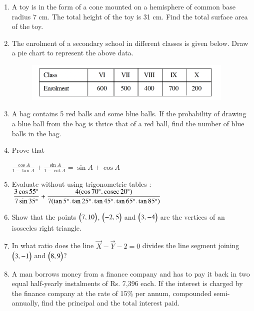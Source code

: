 \documentclass[journal,12pt,twocolumn]{IEEEtran}
\begin{document}
\begin{enumerate}
 \medskip
 \item A toy is in the form of a cone mounted on a hemisphere of common base radius 7 cm. The total height of the toy is 31 cm. Find the total surface area of the toy.
 \medskip
 \item The enrolment of a secondary school in different classes is given below. Draw a pie chart to represent the above data.
 \begin{figure}[h!]
    \centering
    \includegraphics[width=10cm]{7.png}
 \end{figure}
 \medskip
 \item A bag contains 5 red balls and some blue balls. If the probability of drawing a blue ball from the bag is thrice that of a red ball, find the number of blue balls in the bag.
 \medskip
 \item Prove that
 \begin{center}
 $\displaystyle\frac{\cos A}{1-\tan A}+\displaystyle\frac{\sin A}{1-\cot A}=\sin A+\cos A$
 \end{center}
 \medskip
 \item Evaluate without using trigonometric tables :\\
 \bigskip
 $\displaystyle\frac{3\cos55\degree}{7\sin35\degree}+\displaystyle\frac{4(\cos70\degree.\,\text{cosec}\,20\degree)}{7(\tan5\degree.\tan25\degree.\tan45\degree.\tan65\degree.\tan85\degree)}$
 \medskip
 \item Show that the points $\begin{pmatrix}7,10\end{pmatrix} $, $\begin{pmatrix}-2,5\end{pmatrix} $ and $\begin{pmatrix}3,-4\end{pmatrix} $ are the vertices of an isosceles right triangle.
 \medskip
 \item In what ratio does the line $\vec{X}-\vec{Y}-2=0$ divides the line segment joining  $\begin{pmatrix}3,-1\end{pmatrix} $ and  $\begin{pmatrix}8,9\end{pmatrix} $? 
 \medskip
 \item A man borrows money from a finance company and has to pay it back in two equal half-yearly instalments of Rs. 7,396 each. If the interest is charged by the finance company at the rate of 15\%  per annum, compounded semi-annually, find the principal and the total interest paid.
 \bigskip

\end{enumerate}
\end{document}
